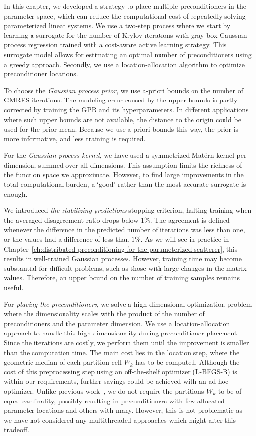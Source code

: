 In this chapter, we developed a strategy to place multiple preconditioners in the parameter space, which can reduce the computational cost of repeatedly solving parameterized linear systems.
We use a two-step process where we start by learning a surrogate for the number of Krylov iterations with gray-box Gaussian process regression trained with a cost-aware active learning strategy.
This surrogate model allows for estimating an optimal number of preconditioners using a greedy approach.
Secondly, we use a location-allocation algorithm to optimize preconditioner locations.

To choose the \textit{Gaussian process prior}, we use a-priori bounds on the number of GMRES iterations.
The modeling error caused by the upper bounds is partly corrected by training the GPR and its hyperparameters.
In different applications where such upper bounds are not available, the distance to the origin could be used for the prior mean.
Because we use a-priori bounds this way, the prior is more informative, and less training is required.

For the \textit{Gaussian process kernel}, we have used a symmetrized Matérn kernel per dimension, summed over all dimensions.
This assumption limits the richness of the function space we approximate.
However, to find large improvements in the total computational burden, a `good' rather than the most accurate surrogate is enough.

We introduced \emph{the stabilizing predictions} stopping criterion, halting training when the averaged disagreement ratio drops below $1\%$.
The agreement is defined whenever the difference in the predicted number of iterations was less than one, or the values had a difference of less than $1\%$.
As we will see in practice in Chapter~\ref{ch:distributed-preconditioning-for-the-parameterized-scatterer}, this results in well-trained Gaussian processes.
However, training time may become substantial for difficult problems, such as those with large changes in the matrix values.
Therefore, an upper bound on the number of training samples remains useful.

For \textit{placing the preconditioners}, we solve a high-dimensional optimization problem where the dimensionality scales with the product of the number of preconditioners and the parameter dimension.
We use a location-allocation approach to handle this high dimensionality during preconditioner placement.
Since the iterations are costly, we perform them until the improvement is smaller than the computation time.
The main cost lies in the location step, where the geometric median of each partition cell $W_k$ has to be computed.
Although the cost of this preprocessing step using an off-the-shelf optimizer (L-BFGS-B) is within our requirements, further savings could be achieved with an ad-hoc optimizer.
Unlike previous work~\cite{venkovic2024}, we do not require the partitions $W_k$ to be of equal cardinality, possibly resulting in preconditioners with few allocated parameter locations and others with many.
However, this is not problematic as we have not considered any multithreaded approaches which might alter this tradeoff.

